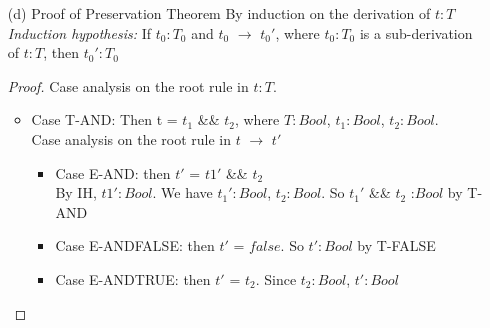 \documentclass{article}
\begin{document}
\begin{description}
\begin{enumerate}
\begin{proof}
\begin{itemize}
\begin{itemize}
                                        Since $v_1$ is a value, by the Canonical Forms lemma, $t_1$ is either true or false. Then Case Analysis on $v_1$
                                        \begin{itemize}
                                            \item Case true, then $v_1$ \&\& $t_2$ $\rightarrow$ $t_2$, by E-ANDTRUE
                                            \item Case false, then $v_1$ \&\& $t_2$ $\rightarrow$ false by E-ANDFALSE
                                        \end{itemize}
                                \end{itemize}
                        \end{itemize}
                    \end{proof}
                \item[(d)]{Proof of Preservation Theorem}
                    By induction on the derivation of $t:T$\\
                    \textit{Induction hypothesis:} If $t_0:T_0$ and $t_0$ $\rightarrow$ $t_0'$, where $t_0:T_0$ is a sub-derivation of $t:T$, then $t_0':T_0$
                    \begin{proof}
                        Case analysis on the root rule in $t:T$.
                        \begin{itemize}
                            \item Case T-AND: Then t = $t_1$ \&\& $t_2$, where $T:Bool$, $t_1:Bool$, $t_2:Bool$. \\
                            Case analysis on the root rule in $t$ $\rightarrow$ $t'$
                            \begin{itemize}
                                \item Case E-AND: then $t'$ = $t1'$ \&\& $t_2$\\
                                    By IH, $t1':Bool$.
                                    We have $t_1':Bool$, $t_2:Bool$. So $t_1'$ \&\& $t_2$ :$Bool$ by T-AND
                                \item Case E-ANDFALSE: then $t'$ = $false$. So $t':Bool$ by T-FALSE
                                \item Case E-ANDTRUE: then $t'$ = $t_2$. Since $t_2:Bool$, $t':Bool$
                            \end{itemize}
                        \end{itemize}

\end{proof}
\end{enumerate}
\end{description}
\end{document}
